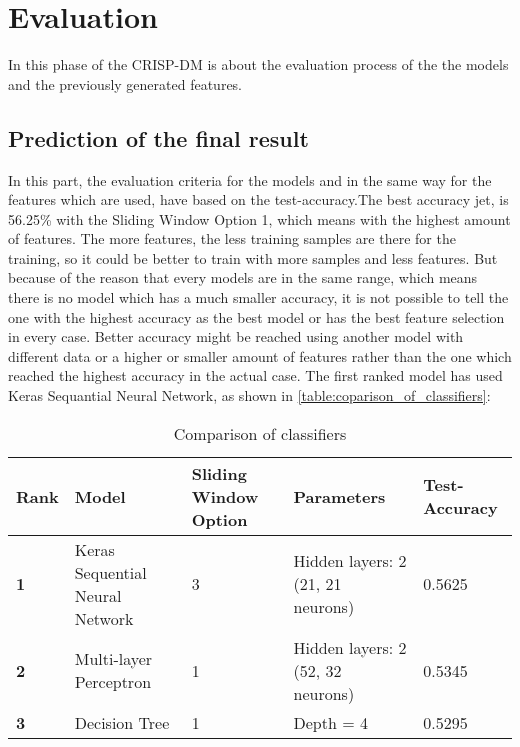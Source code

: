 
\chapter{Evaluation}
In this phase of the CRISP-DM is about the evaluation process of the the models and the previously generated features.\newline

\section{Prediction of the final result}
In this part, the evaluation criteria for the models and in the same way for the features which are used, have based on the test-accuracy.The best accuracy jet, is 56.25\% with the Sliding Window Option 1, which means with the highest amount of features. The more features, the less training samples are there for the training, so it could be better to train with more samples and less features. But because of the reason that every models are in the same range, which means there is no model which has a much smaller accuracy, it is not possible to tell the one with the highest accuracy as the best model or has the best feature selection in every case. Better accuracy might be reached using another model with different data or a higher or smaller amount of features rather than the one which reached the highest accuracy in the actual case. The first ranked model has used Keras Sequantial Neural Network, as shown in \autoref{table:coparison_of_classifiers}:

\begin{table}[H]
\centering
\begin{tabular}{|p{2.5cm}|p{2.5cm}|p{2.5cm}|p{2.5cm}|p{2.5cm}|}
\hline

\textbf{Rank} & \textbf{Model} & \textbf{Sliding Window Option} & \textbf{Parameters} & \textbf{Test-Accuracy} \\ \hline
\textbf{1} & Keras Sequential Neural Network & 3 & Hidden layers: 2 (21, 21 neurons) & 0.5625 \\ \hline
\textbf{2} & Multi-layer Perceptron & 1 & Hidden layers: 2 (52, 32 neurons) & 0.5345 \\ \hline
\textbf{3} & Decision Tree & 1 & Depth = 4 & 0.5295 \\ \hline

\end{tabular}
\caption{Comparison of classifiers}
\label{table:coparison_of_classifiers}
\end{table}

